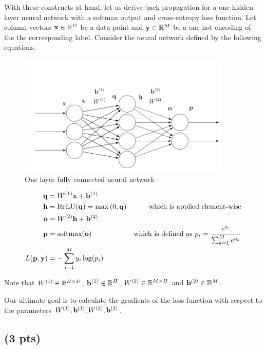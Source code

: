 With these constructs at hand, let us derive back-propagation for a one hidden layer neural network with a softmax output and cross-entropy loss function. Let column vectors ${\bf{x}} \in {\mathbb{R}}^D$ be a data-point and ${\bf{y}} \in {\mathbb{R}}^M$ be a one-hot encoding of the the corresponding label. Consider the neural network defined by the following equations.

\clearpage

\begin{figure}[h]
    \centering
    \includegraphics[width=0.9\textwidth]{images/neural-net.png}
    \caption{One layer fully connected neural network}
    \label{fig:my_label}
\end{figure}

\begin{align}
    {\bf{q}} &= W^{(1)} {\bf{x}} + {\bf{b}}^{(1)} \\
    {\bf{h}} &= \text{ReLU}({\bf{q}})=\max{(0,{\bf{q}})} & \text{which is applied element-wise} \\
    {\bf{o}} &= W^{(2)} {\bf{h}} + {\bf{b}}^{(2)} \\
    {\bf{p}} &= \text{softmax}({\bf{o}}) & \text{which is defined as~}
    p_i = \frac{e^{o_i}}{\sum_{k=1}^M e^{o_k}} \\
    L({\bf{p}}, {\bf{y}}) &= - \sum_{i=1}^M y_i \log(p_i)
\end{align}

Note that $W^{(1)} \in {\mathbb{R}}^{H \times D}$, ${\bf{b}}^{(1)} \in {\mathbb{R}}^H$, $W^{(2)} \in {\mathbb{R}}^{M \times H}$ and ${\bf{b}}^{(2)} \in {\mathbb{R}}^M$.\par

Our ultimate goal is to calculate the gradients of the loss function with respect to the parameters $W^{(1)},{\bf{b}}^{(1)},W^{(2)},{\bf{b}}^{(2)}$. 

\clearpage


\subsection{(3 pts)}

